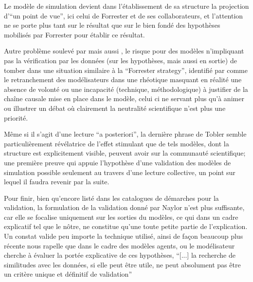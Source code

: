 Le modèle de simulation devient dans l'établissement de sa structure la projection d'\enquote{un point de vue}, ici celui de Forrester et de ses collaborateurs, et l'attention ne se porte plus tant sur le résultat que sur le bien fondé des hypothèses mobilisés par Forrester pour établir ce résultat. 

Autre problème soulevé par \textcite{Tobler1970a} mais aussi \textcite{Batty2001}, le risque pour des modèles n'impliquant pas la vérification par les données (sur les hypothèses, mais aussi en sortie) de tomber dans une situation similaire à la \foreignquote{english}{Forrester strategy}, identifié par \textcite[7-8]{Batty2001} comme le retranchement des modélisateurs dans une rhéotique masquant en réalité une absence de volonté ou une incapacité (technique, méthodologique) à justifier de la chaîne causale mise en place dans le modèle, celui ci ne servant plus qu'à animer ou illustrer un débat où clairement la neutralité scientifique n'est plus une priorité.

Même si il s'agit d'une lecture \foreignquote{latin}{a posteriori}, la dernière phrase de Tobler semble particulièrement révélatrice de l'effet stimulant que de tels modèles, dont la structure est explicitement visible, peuvent avoir sur la communauté scientifique; une première preuve qui appuie l'hypothèse d'une validation des modèles de simulation possible seulement au travers d'une lecture collective, un point sur lequel il faudra revenir par la suite.

 
Pour finir, bien qu'encore listé dans les catalogues de démarches pour la validation, la formulation de la validation donné par Naylor n'est plus suffisante, car elle se focalise uniquement sur les sorties du modèles, ce qui dans un cadre explicatif tel que le nôtre, ne constitue qu'une toute petite partie de l'explication. Un constat valide peu importe la technique utilisé, ainsi de façon beaucoup plus récente \textcite[106]{Amblard2006} nous rapelle que dans le cadre des modèles agents, ou le modélisateur cherche à évaluer la portée explicative de ces hypothèses, \enquote{[...] la recherche de similitudes avec les données, si elle peut être utile, ne peut absolument pas être un critère unique et définitif de validation}

